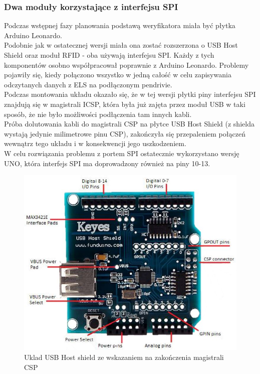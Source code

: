 \documentclass[declaration,shortabstract, mgr]{iithesis}
\begin{document}
\subsubsection{Dwa moduły korzystające z interfejsu SPI}
\indent Podczas wstępnej fazy planowania podstawą weryfikatora miała być płytka Arduino Leonardo. \\
\indent Podobnie jak w ostatecznej wersji miała ona zostać rozszerzona o USB Host Shield oraz moduł RFID - oba używają interfejsu SPI. Każdy z tych komponentów osobno współpracował poprawnie z Arduino Leonardo. Problemy pojawiły się, kiedy połączono wszystko w jedną całość w celu zapisywania odczytanych danych z ELS na podłączonym pendrivie. \\
\indent Podczas montowania układu okazało się, że w tej wersji płytki piny interfejsu SPI znajdują się w magistrali ICSP, która była już zajęta przez moduł USB w taki sposób, że nie było możliwości podłączenia tam innych kabli. \\
\indent Próba dolutowania kabli do magistrali CSP na płytce USB Host Shield (z shielda wystają jedynie milimetrowe pinu CSP), zakończyła się przepaleniem połączeń wewnątrz tego układu i w konsekwencji jego uszkodzeniem. \\
\indent W celu rozwiązania problemu z portem SPI ostatecznie wykorzystano wersję UNO, która interfejs SPI ma doprowadzony również na piny 10-13. \\
\begin{figure}[h]
\caption{Uklad USB Host shield ze wskazaniem na zakończenia magistrali CSP}
\centering
\includegraphics[scale=0.35]{usb_host_shield.jpg}
\end{figure}
\end{document}

